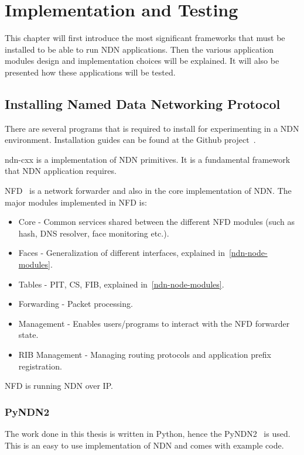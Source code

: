 \chapter{Implementation and Testing}
This chapter will first introduce the most significant frameworks that must be installed to be able to run \gls{NDN} applications.
Then the various application modules design and implementation choices will be explained. 
It will also be presented how these applications will be tested.

\section{Installing Named Data Networking Protocol}

There are several programs that is required to install for experimenting in a \gls{NDN} environment.
Installation guides can be found at the Github project~\cite{ndn-git}.

\gls{ndn-cxx} is a implementation of \gls{NDN} primitives. 
It is a fundamental framework that \gls{NDN} application requires. 

\gls{NFD}~\cite{nfd} is a network forwarder and also in the core implementation of \gls{NDN}.
The major modules implemented in \gls{NFD} is:
\begin{itemize}
  \item Core - Common services shared between the different \gls{NFD} modules (such as hash, \gls{DNS} resolver, face monitoring etc.).
  \item Faces - Generalization of different interfaces, explained in~\autoref{ndn-node-modules}.
  \item Tables - \gls{PIT}, \gls{CS}, \gls{FIB}, explained in~\autoref{ndn-node-modules}.
  \item Forwarding - Packet processing.
  \item Management - Enables users/programs to interact with the \gls{NFD} forwarder state.
  \item\gls{RIB} Management - Managing routing protocols and application prefix registration.
\end{itemize}
\gls{NFD} is running \gls{NDN} over \gls{IP}.

\subsection{PyNDN2}
The work done in this thesis is written in Python, hence the \gls{PyNDN2}~\cite{pyndn2-git} is used.
This is an easy to use implementation of \gls{NDN} and comes with example code.

